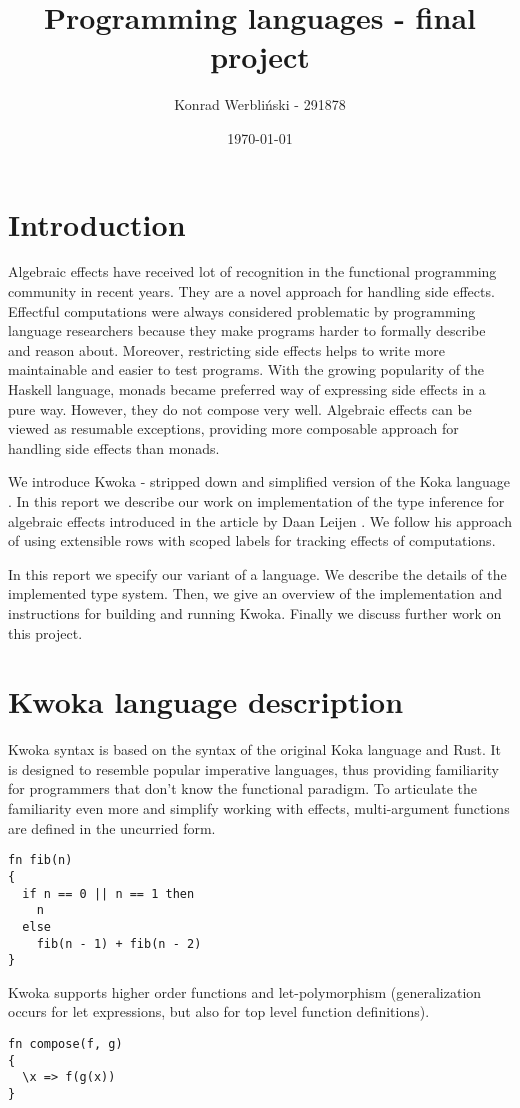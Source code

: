 \documentclass[a4paper]{article}
\author{Konrad Werbliński - 291878}
\title{Programming languages - final project}
\date{\today}
\begin{document}
\maketitle

\section{Introduction}
Algebraic effects have received lot of recognition in
the functional programming community in recent years.
They are a novel approach for handling side effects.
Effectful computations were always considered problematic by
programming language researchers because they make programs harder to
formally describe and reason about. Moreover, restricting side effects helps to
write more maintainable and easier to test programs.
With the growing popularity of the Haskell language, monads became preferred way of
expressing side effects in a pure way. However, they do not compose very well.
Algebraic effects can be viewed as resumable exceptions, providing more composable
approach for handling side effects than monads.

We introduce Kwoka - stripped down and simplified version of the Koka language \cite{Koka}.
In this report we describe our work on implementation of the
type inference for algebraic effects introduced
in the article by Daan Leijen \cite{leijen2017type}.
We follow his approach of using extensible rows with
scoped labels for tracking effects of computations.

In this report we specify our variant of a language. We describe the
details of the implemented type system.
Then, we give an overview of the implementation and instructions for building and running Kwoka.
Finally we discuss further work on this project.

\section{Kwoka language description}
Kwoka syntax is based on the syntax of the original Koka language and Rust.
It is designed to resemble popular imperative languages, thus providing familiarity
for programmers that don't know the functional paradigm.
To articulate the familiarity even more and simplify working with effects, multi-argument
functions are defined in the uncurried form.
\begin{verbatim}
fn fib(n)
{
  if n == 0 || n == 1 then
    n
  else
    fib(n - 1) + fib(n - 2)
}
\end{verbatim}
Kwoka supports higher order functions and let-polymorphism
(generalization occurs for let expressions, but also for top level function definitions).
\begin{verbatim}
fn compose(f, g)
{
  \x => f(g(x))
}
\end{verbatim}
\end{document}

